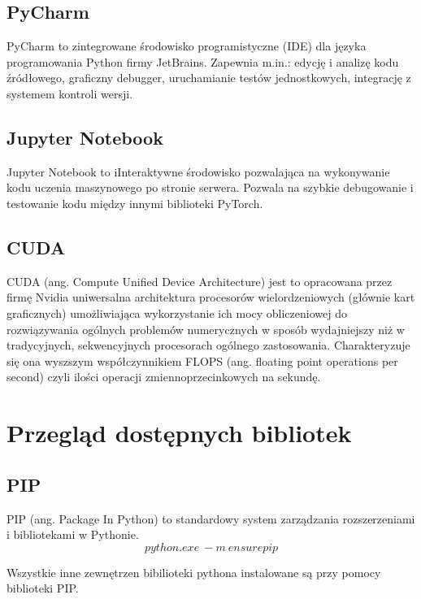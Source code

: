 \documentclass[brudnopis]{xmgr}
\begin{document}
\section{PyCharm\label{s:dsssl}}
 PyCharm to zintegrowane środowisko programistyczne (IDE) dla języka programowania Python firmy JetBrains. Zapewnia m.in.: edycję i analizę kodu źródłowego, graficzny debugger, uruchamianie testów jednostkowych, integrację z systemem kontroli wersji.
 
 \section{Jupyter Notebook\label{s:dsssl}}
 
Jupyter Notebook to iInteraktywne środowisko pozwalająca na wykonywanie kodu uczenia maszynowego po stronie serwera. Pozwala na szybkie debugowanie i testowanie kodu między innymi biblioteki PyTorch.

 \section{CUDA\label{s:dsssl}}
 
CUDA (ang. Compute Unified Device Architecture) jest to opracowana przez firmę Nvidia uniwersalna architektura procesorów wielordzeniowych (głównie kart graficznych) umożliwiająca wykorzystanie ich mocy obliczeniowej do rozwiązywania ogólnych problemów numerycznych w sposób wydajniejszy niż w tradycyjnych, sekwencyjnych procesorach ogólnego zastosowania. Charakteryzuje się ona wyszszym współczynnikiem FLOPS (ang. floating point operations per second) czyli ilości operacji zmiennoprzecinkowych na sekundę.


\chapter{Przegląd dostępnych bibliotek}


 \section{PIP\label{s:dsssl}}
 PIP (ang. Package In Python) to standardowy system zarządzania rozszerzeniami i bibliotekami w Pythonie.
 \begin{equation}
python.exe\:-m\:ensurepip
\end{equation}

Wszystkie inne zewnętrzen bibilioteki pythona instalowane są przy pomocy biblioteki PIP.
 
\end{document}
